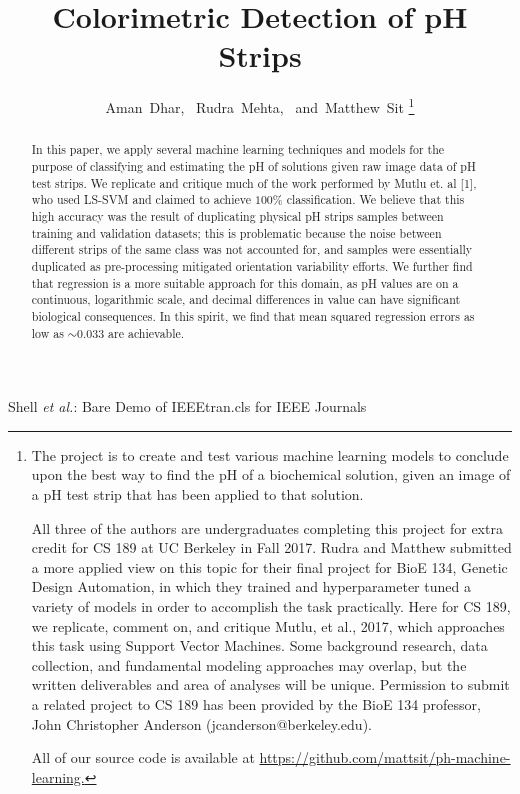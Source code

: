 \documentclass[journal]{IEEEtran}
\begin{document}
\title{Colorimetric Detection of pH Strips}
\author{Aman~Dhar,~
        Rudra~Mehta,~
        and~Matthew~Sit
\thanks{The project is to create and test various machine learning models to conclude upon the best way to find the pH of a biochemical solution, given an image of a pH test strip that has been applied to that solution.

All three of the authors are undergraduates completing this project for extra credit for CS 189 at UC Berkeley in Fall 2017. Rudra and Matthew submitted a more applied view on this topic for their final project for BioE 134, Genetic Design Automation, in which they trained and hyperparameter tuned a variety of models in order to accomplish the task practically. Here for CS 189, we replicate, comment on, and critique Mutlu, et al., 2017, which approaches this task using Support Vector Machines. Some background research, data collection, and fundamental modeling approaches may overlap, but the written deliverables and area of analyses will be unique. Permission to submit a related project to CS 189 has been provided by the BioE 134 professor, John Christopher Anderson (jcanderson@berkeley.edu).

All of our source code is available at \url{https://github.com/mattsit/ph-machine-learning.}}}

%
{Shell \MakeLowercase{\textit{et al.}}: Bare Demo of IEEEtran.cls for IEEE Journals}

\maketitle

\begin{abstract}
In this paper, we apply several machine learning techniques and models for the purpose of classifying and estimating the pH of solutions given raw image data of pH test strips. We replicate and critique much of the work performed by Mutlu et. al [1], who used LS-SVM and claimed to achieve $100\%$ classification. We believe that this high accuracy was the result of duplicating physical pH strips samples between training and validation datasets; this is problematic because the noise between different strips of the same class was not accounted for, and samples were essentially duplicated as pre-processing mitigated orientation variability efforts. We further find that regression is a more suitable approach for this domain, as pH values are on a continuous, logarithmic scale, and decimal differences in value can have significant biological consequences. In this spirit, we find that mean squared regression errors as low as $\sim 0.033$ are achievable.
\end{abstract}
\end{document}
